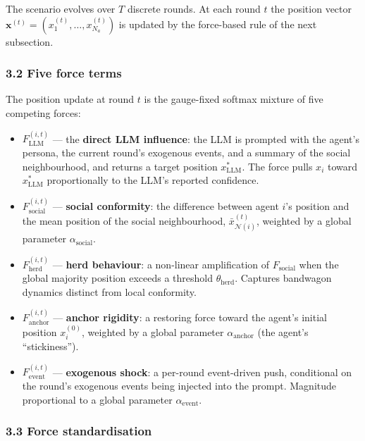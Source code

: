 \documentclass[
]{article}
\begin{document}
The scenario evolves over \(T\) discrete rounds. At each round \(t\) the
position vector
\(\mathbf{x}^{(t)} = (x_1^{(t)}, \ldots, x_{N_a}^{(t)})\) is updated by
the force-based rule of the next subsection.

\subsubsection{3.2 Five force terms}\label{five-force-terms}

The position update at round \(t\) is the gauge-fixed softmax mixture of
five competing forces:

\begin{itemize}
\item
  \(F_{\text{LLM}}^{(i,t)}\) --- the \textbf{direct LLM influence}: the
  LLM is prompted with the agent's persona, the current round's
  exogenous events, and a summary of the social neighbourhood, and
  returns a target position \(x^{*}_{\text{LLM}}\). The force pulls
  \(x_i\) toward \(x^{*}_{\text{LLM}}\) proportionally to the LLM's
  reported confidence.
\item
  \(F_{\text{social}}^{(i,t)}\) --- \textbf{social conformity}: the
  difference between agent \(i\)'s position and the mean position of the
  social neighbourhood, \(\bar{x}_{\mathcal{N}(i)}^{(t)}\), weighted by
  a global parameter \(\alpha_{\text{social}}\).
\item
  \(F_{\text{herd}}^{(i,t)}\) --- \textbf{herd behaviour}: a non-linear
  amplification of \(F_{\text{social}}\) when the global majority
  position exceeds a threshold \(\theta_{\text{herd}}\). Captures
  bandwagon dynamics distinct from local conformity.
\item
  \(F_{\text{anchor}}^{(i,t)}\) --- \textbf{anchor rigidity}: a
  restoring force toward the agent's initial position \(x_i^{(0)}\),
  weighted by a global parameter \(\alpha_{\text{anchor}}\) (the agent's
  ``stickiness'').
\item
  \(F_{\text{event}}^{(i,t)}\) --- \textbf{exogenous shock}: a per-round
  event-driven push, conditional on the round's exogenous events being
  injected into the prompt. Magnitude proportional to a global parameter
  \(\alpha_{\text{event}}\).
\end{itemize}

\subsubsection{3.3 Force standardisation}\label{force-standardisation}
\end{document}
